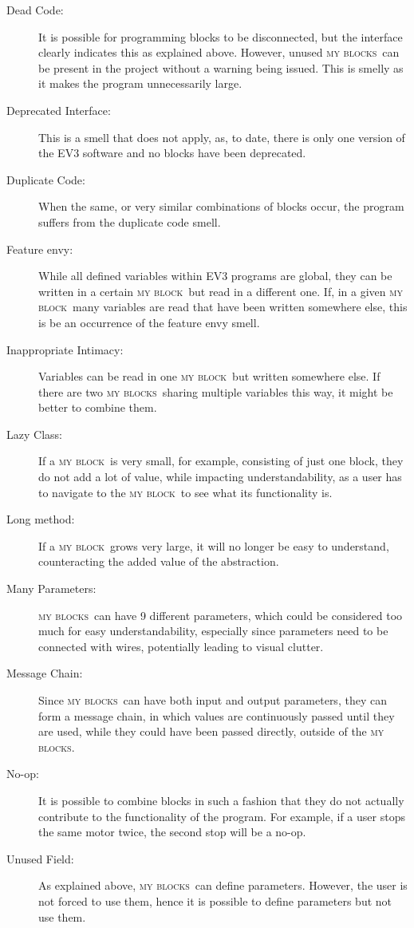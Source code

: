 \documentclass{sig-alternate}
\newcommand{\mbs}{\textsc{my blocks}}
\newcommand{\mb}{\textsc{my block}}
\begin{document}
\begin{description}
\item[Dead Code:] It is possible for programming blocks to be disconnected, but the interface clearly indicates this as explained above. However, unused \mbs~can be present in the project without a warning being issued. This is smelly as it makes the program unnecessarily large.
\item[Deprecated Interface:] This is a smell that does not apply, as, to date, there is only one version of the EV3 software and no blocks have been deprecated.
\item[Duplicate Code:] When the same, or very similar combinations of blocks occur, the program suffers from the duplicate code smell.
\item[Feature envy:] While all defined variables within EV3 programs are global, they can be written in a certain \mb~but read in a different one. If, in a given \mb~many variables are read that have been written somewhere else, this is be an occurrence of the feature envy smell. 
\item[Inappropriate Intimacy:] Variables can be read in one \mb~but written somewhere else. If there are two \mbs~sharing multiple variables this way, it might be better to combine them.
\item[Lazy Class:] If a \mb~is very small, for example, consisting of just one block, they do not add a lot of value, while impacting understandability, as a user has to navigate to the \mb~to see what its functionality is.
\item[Long method:] If a \mb~grows very large, it will no longer be easy to understand, counteracting the added value of the abstraction.
\item[Many Parameters:] \mbs~can have 9 different parameters, which could be considered too much for easy understandability, especially since parameters need to be connected with wires, potentially leading to visual clutter.
\item[Message Chain:] Since \mbs~can have both input and output parameters, they can form a message chain, in which values are continuously passed until they are used, while they could have been passed directly, outside of the \mbs.
\item[No-op:] It is possible to combine blocks in such a fashion that they do not actually contribute to the functionality of the program. For example, if a user stops the same motor twice, the second stop will be a no-op.
\item[Unused Field:] As explained above, \mbs~can define parameters. However, the user is not forced to use them, hence it is possible to define parameters but not use them.

\end{description}
\end{document}
